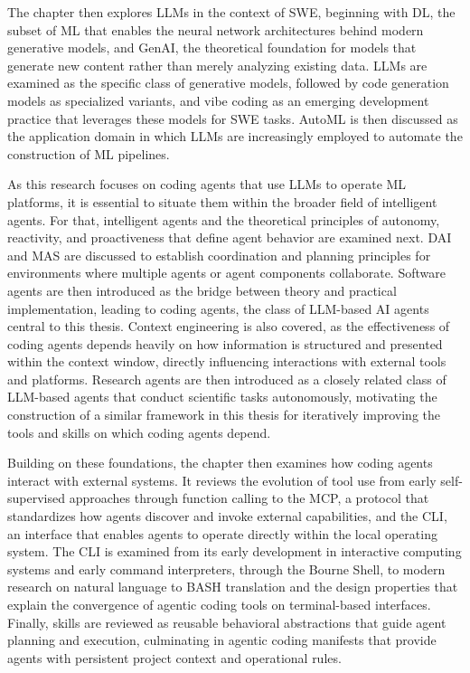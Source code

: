 \documentclass[
english,                 %
bibtex,                  %
includeExtraAbstracts, %
]{kththesis}
\numberwithin{listing}{chapter}
\begin{document}
The chapter then explores \glspl{LLM} in the context of \gls{SWE}, beginning with \gls{DL}, the subset of \gls{ML} that enables the neural network architectures behind modern generative models, and \gls{GenAI}, the theoretical foundation for models that generate new content rather than merely analyzing existing data. \Glspl{LLM} are examined as the specific class of generative models, followed by code generation models as specialized variants, and vibe coding as an emerging development practice that leverages these models for \gls{SWE} tasks. \Gls{AutoML} is then discussed as the application domain in which \glspl{LLM} are increasingly employed to automate the construction of \gls{ML} pipelines.

As this research focuses on coding agents that use \glspl{LLM} to operate \gls{ML} platforms, it is essential to situate them within the broader field of intelligent agents. For that, intelligent agents and the theoretical principles of autonomy, reactivity, and proactiveness that define agent behavior are examined next. \Gls{DAI} and \gls{MAS} are discussed to establish coordination and planning principles for environments where multiple agents or agent components collaborate. Software agents are then introduced as the bridge between theory and practical implementation, leading to coding agents, the class of \gls{LLM}-based \gls{AI} agents central to this thesis. Context engineering is also covered, as the effectiveness of coding agents depends heavily on how information is structured and presented within the context window, directly influencing interactions with external tools and platforms. Research agents are then introduced as a closely related class of \gls{LLM}-based agents that conduct scientific tasks autonomously, motivating the construction of a similar framework in this thesis for iteratively improving the tools and skills on which coding agents depend.

Building on these foundations, the chapter then examines how coding agents interact with external systems. It reviews the evolution of tool use from early self-supervised approaches through function calling to the \gls{MCP}, a protocol that standardizes how agents discover and invoke external capabilities, and the \gls{CLI}, an interface that enables agents to operate directly within the local operating system. The \gls{CLI} is examined from its early development in interactive computing systems and early command interpreters, through the Bourne Shell, to modern research on natural language to \gls{BASH} translation and the design properties that explain the convergence of agentic coding tools on terminal-based interfaces. Finally, skills are reviewed as reusable behavioral abstractions that guide agent planning and execution, culminating in agentic coding manifests that provide agents with persistent project context and operational rules.
\end{document}
